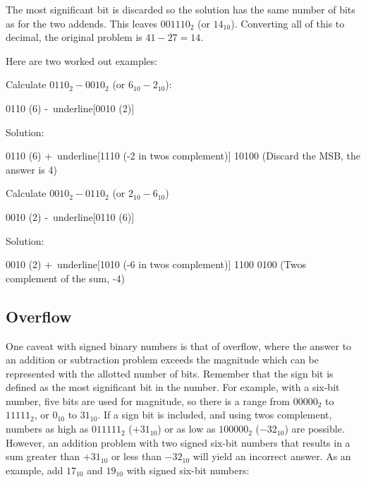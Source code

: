 The most significant bit is discarded so the solution has the same number of bits as for the two addends. This leaves $ 001110_2 $ (or $ 14_{10} $). Converting all of this to decimal, the original problem is $ 41-27=14 $.

Here are two worked out examples:

Calculate $ 0110_2 - 0010_2 $ (or $ 6_{10} - 2_{10} $):

\begin{binDisp}[commandchars=~\[\]]
     0110  (6)
    -~underline[0010  (2)]
\end{binDisp}

Solution:

\begin{binDisp}[commandchars=~\[\]]
     0110  (6)
    +~underline[1110  (-2 in twos complement)]
    10100  (Discard the MSB, the answer is 4)
\end{binDisp}

Calculate $ 0010_2 - 0110_2 $ (or $ 2_{10} - 6_{10} $)

\begin{binDisp}[commandchars=~\[\]]
     0010  (2)
    -~underline[0110  (6)]
\end{binDisp}

Solution:

\begin{binDisp}[commandchars=~\[\]]
     0010  (2)
    +~underline[1010  (-6 in twos complement)]
     1100
     0100  (Twos complement of the sum, -4)
\end{binDisp}

\subsection{Overflow}
\label{MO:sub:overflow}

One caveat with signed binary numbers is that of overflow, where the answer to an addition or subtraction problem exceeds the magnitude which can be represented with the allotted number of bits. Remember that the sign bit is defined as the most significant bit in the number. For example, with a six-bit number, five bits are used for magnitude, so there is a range from $ 00000_2 $ to $ 11111_2 $, or $ 0_{10} $ to $ 31_{10} $. If a sign bit is included, and using twos complement, numbers as high as $ 011111_2 $ ($ +31_{10} $) or as low as $ 100000_2 $ ($ -32_{10} $) are possible. However, an addition problem with two signed six-bit numbers that results in a sum greater than $ +31_{10} $ or less than $ -32_{10} $ will yield an incorrect answer. As an example, add $ 17_{10} $ and $ 19_{10} $ with signed six-bit numbers: 

